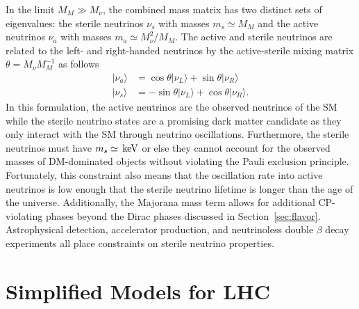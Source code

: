 In the limit $M_M \gg M_\nu$, %
the combined mass matrix has two distinct sets of eigenvalues: the sterile neutrinos $\nu_s$ with masses $m_s \simeq M_M$ and the active neutrinos $\nu_a$ with masses $m_a \simeq M_\nu^2 / M_M$.
The active and sterile neutrinos are related to the left- and right-handed neutrinos by the active-sterile mixing matrix $\theta = M_\nu M_M^{-1}$ as follows
\begin{align}
  | \nu_a \rangle & = \cos \theta | \nu_L \rangle + \sin \theta |\nu_R \rangle \nonumber \\
  | \nu_s \rangle & = - \sin \theta | \nu_L \rangle + \cos \theta |\nu_R \rangle.
\end{align}
In this formulation, the active neutrinos are the observed neutrinos of the SM while the sterile neutrino states are a promising dark matter candidate as they only interact with the SM through neutrino oscillations.
Furthermore, the sterile neutrinos must have $m_s \simeq \,\text{ke\hspace{-.08em}V}$ or else they cannot account for the observed masses of DM-dominated objects without violating the Pauli exclusion principle. %
Fortunately, this constraint also means that the oscillation rate into active neutrinos is low enough that the sterile neutrino lifetime is longer than the age of the universe.
Additionally, the Majorana mass term allows for additional CP-violating phases beyond the Dirac phases discussed in Section~\ref{sec:flavor}.
Astrophysical detection, accelerator production, and neutrinoless double $\beta$ decay experiments all place constraints on sterile neutrino properties. %

\section{Simplified Models for LHC}
\label{sec:dm_simp}

